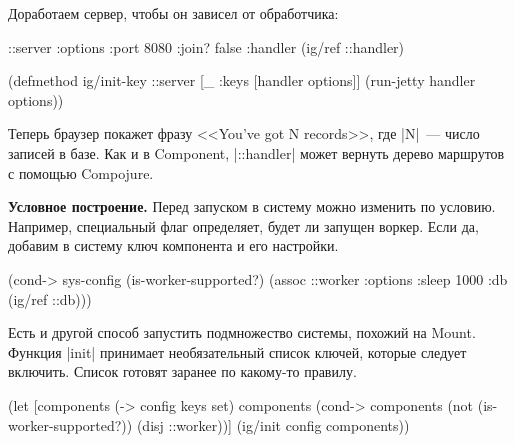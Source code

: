 \begin{english}
\end{english}

Доработаем сервер, чтобы он зависел от обработчика:

\begin{english}
  \begin{clojure}
{::server {:options {:port 8080 :join? false}
           :handler (ig/ref ::handler)}}

(defmethod ig/init-key ::server
  [_ {:keys [handler options]}]
  (run-jetty handler options))
  \end{clojure}
\end{english}

Теперь браузер покажет фразу <<You've got N records>>, где \spverb|N|~--- число
записей в базе. Как и в Component, \spverb|::handler| может вернуть дерево
маршрутов с помощью Compojure.

\textbf{Условное построение.} Перед запуском в систему можно изменить по
условию. Например, специальный флаг определяет, будет ли запущен воркер. Если
да, добавим в систему ключ компонента и его настройки.

\begin{english}
  \begin{clojure}
(cond-> sys-config
  (is-worker-supported?)
  (assoc ::worker {:options {:sleep 1000}
                   :db (ig/ref ::db)}))
  \end{clojure}
\end{english}

Есть и другой способ запустить подмножество системы, похожий на Mount. Функция
\spverb|init| принимает необязательный список ключей, которые следует
включить. Список готовят заранее по какому-то правилу.

\begin{english}
  \begin{clojure}
(let [components (-> config keys set)
      components (cond-> components
                   (not (is-worker-supported?))
                   (disj ::worker))]
  (ig/init config components))
  \end{clojure}
\end{english}

